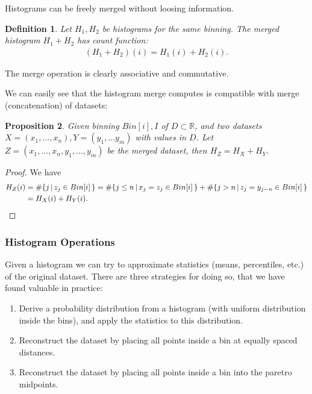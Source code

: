 \documentclass{article}
\theoremstyle{plain}
\newtheorem{definition}{Definition}[section]
\newtheorem{proposition}[definition]{Proposition}
\theoremstyle{remark}
\newcommand{\IR}{\mathbb{R}}
\begin{document}
Histograms can be freely merged without loosing information.

\begin{definition}
  Let $H_1, H_2$ be histograms for the same binning. The merged histogram $H_1 + H_2$ has count function:
  \begin{align*}
    (H_1+H_2)(i) = H_1(i) + H_2(i).
  \end{align*}
\end{definition}
The merge operation is clearly associative and commutative.

We can easily see that the histogram merge computes is compatible with merge (concatenation) of datasets:
\begin{proposition}
  Given binning $Bin[i],I$ of $D \subset \IR$, and two datasets $X = (x_1,\dots,x_n),Y=(y_1,...y_m)$ with
  values in $D$. Let $Z=(x_1, \dots, x_n, y_1, \dots, y_m)$ be the merged dataset, then $H_Z = H_X + H_Y$.
\end{proposition}

\begin{proof}
  We have
  \begin{align*}
    H_Z(i) &= \# \{ j \, | \, z_j \in Bin[i] \, \} =
    \# \{ j \leq n \, | \, x_j = z_j \in Bin[i] \, \} +
    \# \{ j > n \, | \, z_j = y_{j-n} \in Bin[i] \, \} \\
    &= H_X(i) + H_Y(i). \qedhere
  \end{align*}
\end{proof}

\subsubsection{Histogram Operations}

Given a histogram we can try to approximate statistics (means, percentiles, etc.) of the original dataset.
There are three strategies for doing so, that we have found valuable in practice:

\begin{enumerate}
\item Derive a probability distribution from a histogram (with uniform distribution inside the
  bins), and apply the statistics to this distribution.
\item Reconstruct the dataset by placing all points inside a bin at equally spaced distances.
\item Reconstruct the dataset by placing all points inside a bin into the paretro midpoints.
\end{enumerate}
\end{document}
